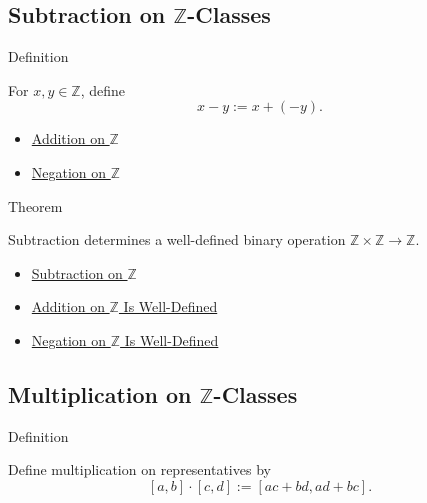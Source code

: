 \subsection*{\texorpdfstring{Subtraction on $\mathbb{Z}$-Classes}{Subtraction on Z-Classes}}

\begin{definitionbox}{Definition}
\begin{definition}
\label{def:subtraction-on-z}
For $x,y\in\mathbb{Z}$, define
\[
x-y:=x+(-y).
\]
\end{definition}
\end{definitionbox}

\begin{dependencies}
\begin{itemize}
  \item \hyperref[def:addition-on-z-classes]{Addition on $\mathbb{Z}$}
  \item \hyperref[def:negation-on-z-classes]{Negation on $\mathbb{Z}$}
\end{itemize}
\end{dependencies}

\begin{theorembox}{Theorem}
\begin{theorem}
\label{thm:subtraction-on-z-well-defined}
Subtraction determines a well-defined binary operation
$\mathbb{Z}\times\mathbb{Z}\to\mathbb{Z}$.
\end{theorem}
\end{theorembox}

\begin{dependencies}
\begin{itemize}
  \item \hyperref[def:subtraction-on-z]{Subtraction on $\mathbb{Z}$}
  \item \hyperref[thm:addition-on-z-well-defined]{Addition on $\mathbb{Z}$ Is Well-Defined}
  \item \hyperref[thm:negation-on-z-well-defined]{Negation on $\mathbb{Z}$ Is Well-Defined}
\end{itemize}
\end{dependencies}

\subsection*{\texorpdfstring{Multiplication on $\mathbb{Z}$-Classes}{Multiplication on Z-Classes}}

\begin{definitionbox}{Definition}
\begin{definition}
\label{def:multiplication-on-z-classes}
Define multiplication on representatives by
\[
[a,b]\cdot[c,d]:=[ac+bd,ad+bc].
\]
\end{definition}
\end{definitionbox}

